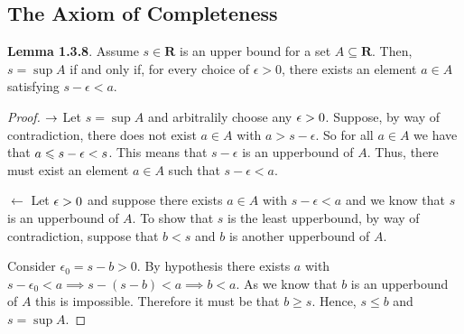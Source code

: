 \documentclass{report}
\begin{document}
\subsection{The Axiom of Completeness}

\bigskip


\textbf{Lemma 1.3.8}. Assume $s \in \mathbf{R}$ is an upper bound for a set $A \subseteq \mathbf{R}$. Then, $s=\sup A$ if and only if, for every choice of $\epsilon>0$, there exists an element $a \in A$ satisfying $s-\epsilon<a$.

\begin{proof}
\par
$\rightarrow$
Let  $s = \sup A$ and arbitralily choose any $\epsilon >0$. Suppose, by way of contradiction, there does not exist $a \in A$ with $a > s- \epsilon$. So for all $a \in A$ we have that $ a \leqslant s - \epsilon < s$. This means that $s-\epsilon$ is an upperbound of $A$. Thus, there must exist an element $a \in A$ such that $s- \epsilon <a.$


\par
$\leftarrow$
Let $ \epsilon > 0$ and suppose there exists $a \in A$ with $s-\epsilon < a$ and we know that $s$ is an upperbound of $A$. To show that $s$ is the least upperbound, by way of contradiction, suppose that $b<s$ and $b$ is another upperbound of $A$.
\par 
Consider $\epsilon_{0} = s - b > 0.$ By hypothesis there exists $a$ with $s - \epsilon_{0} < a \implies s - (s - b) < a \implies  b < a.$ As we know that $b$ is an upperbound of $A$ this is impossible. Therefore it must be that $b \geq s$. Hence, $s \leq b$ and $s = \sup A.$
\end{proof}
\end{document}
